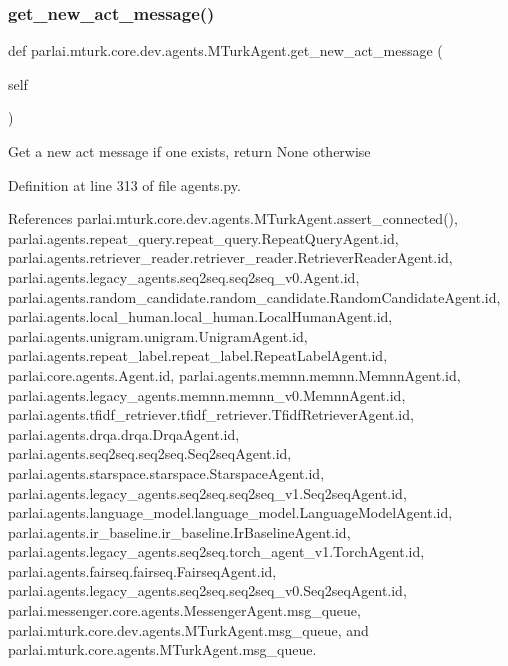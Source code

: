 \subsubsection{\texorpdfstring{get\+\_\+new\+\_\+act\+\_\+message()}{get\_new\_act\_message()}}
{\footnotesize\ttfamily def parlai.\+mturk.\+core.\+dev.\+agents.\+M\+Turk\+Agent.\+get\+\_\+new\+\_\+act\+\_\+message (\begin{DoxyParamCaption}\item[{}]{self }\end{DoxyParamCaption})}

\begin{DoxyVerb}Get a new act message if one exists, return None otherwise\end{DoxyVerb}
 

Definition at line 313 of file agents.\+py.



References parlai.\+mturk.\+core.\+dev.\+agents.\+M\+Turk\+Agent.\+assert\+\_\+connected(), parlai.\+agents.\+repeat\+\_\+query.\+repeat\+\_\+query.\+Repeat\+Query\+Agent.\+id, parlai.\+agents.\+retriever\+\_\+reader.\+retriever\+\_\+reader.\+Retriever\+Reader\+Agent.\+id, parlai.\+agents.\+legacy\+\_\+agents.\+seq2seq.\+seq2seq\+\_\+v0.\+Agent.\+id, parlai.\+agents.\+random\+\_\+candidate.\+random\+\_\+candidate.\+Random\+Candidate\+Agent.\+id, parlai.\+agents.\+local\+\_\+human.\+local\+\_\+human.\+Local\+Human\+Agent.\+id, parlai.\+agents.\+unigram.\+unigram.\+Unigram\+Agent.\+id, parlai.\+agents.\+repeat\+\_\+label.\+repeat\+\_\+label.\+Repeat\+Label\+Agent.\+id, parlai.\+core.\+agents.\+Agent.\+id, parlai.\+agents.\+memnn.\+memnn.\+Memnn\+Agent.\+id, parlai.\+agents.\+legacy\+\_\+agents.\+memnn.\+memnn\+\_\+v0.\+Memnn\+Agent.\+id, parlai.\+agents.\+tfidf\+\_\+retriever.\+tfidf\+\_\+retriever.\+Tfidf\+Retriever\+Agent.\+id, parlai.\+agents.\+drqa.\+drqa.\+Drqa\+Agent.\+id, parlai.\+agents.\+seq2seq.\+seq2seq.\+Seq2seq\+Agent.\+id, parlai.\+agents.\+starspace.\+starspace.\+Starspace\+Agent.\+id, parlai.\+agents.\+legacy\+\_\+agents.\+seq2seq.\+seq2seq\+\_\+v1.\+Seq2seq\+Agent.\+id, parlai.\+agents.\+language\+\_\+model.\+language\+\_\+model.\+Language\+Model\+Agent.\+id, parlai.\+agents.\+ir\+\_\+baseline.\+ir\+\_\+baseline.\+Ir\+Baseline\+Agent.\+id, parlai.\+agents.\+legacy\+\_\+agents.\+seq2seq.\+torch\+\_\+agent\+\_\+v1.\+Torch\+Agent.\+id, parlai.\+agents.\+fairseq.\+fairseq.\+Fairseq\+Agent.\+id, parlai.\+agents.\+legacy\+\_\+agents.\+seq2seq.\+seq2seq\+\_\+v0.\+Seq2seq\+Agent.\+id, parlai.\+messenger.\+core.\+agents.\+Messenger\+Agent.\+msg\+\_\+queue, parlai.\+mturk.\+core.\+dev.\+agents.\+M\+Turk\+Agent.\+msg\+\_\+queue, and parlai.\+mturk.\+core.\+agents.\+M\+Turk\+Agent.\+msg\+\_\+queue.




